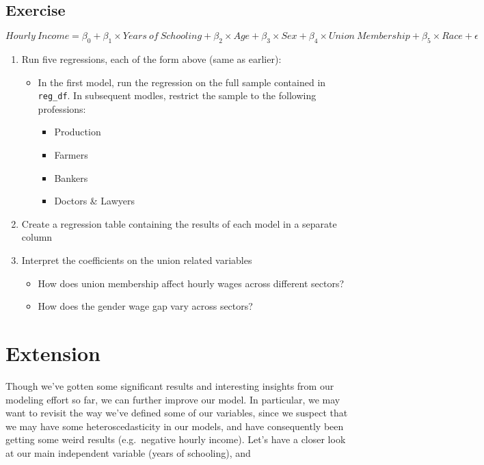 \documentclass[
  letterpaper,
  DIV=11,
  numbers=noendperiod]{scrreprt}
\providecommand{\tightlist}{%
  \setlength{\itemsep}{0pt}\setlength{\parskip}{0pt}}\usepackage{longtable,booktabs,array}
\begin{document}
\hypertarget{exercise-27}{%
\subsection{Exercise}\label{exercise-27}}

\[ Hourly\ Income= \beta_0 + \beta_1 \times Years\ of\ Schooling + \beta_2 \times Age + \beta_3 \times Sex + \beta_4 \times Union\ Membership + \beta_5 \times Race +\epsilon \]

\begin{enumerate}
\def\labelenumi{\arabic{enumi}.}
\tightlist
\item
  Run five regressions, each of the form above (same as earlier):

  \begin{itemize}
  \tightlist
  \item
    In the first model, run the regression on the full sample contained
    in \texttt{reg\_df}. In subsequent modles, restrict the sample to
    the following professions:

    \begin{itemize}
    \tightlist
    \item
      Production
    \item
      Farmers
    \item
      Bankers
    \item
      Doctors \& Lawyers
    \end{itemize}
  \end{itemize}
\item
  Create a regression table containing the results of each model in a
  separate column
\item
  Interpret the coefficients on the union related variables

  \begin{itemize}
  \tightlist
  \item
    How does union membership affect hourly wages across different
    sectors?
  \item
    How does the gender wage gap vary across sectors?
  \end{itemize}
\end{enumerate}

\hypertarget{extension-4}{%
\section{Extension}\label{extension-4}}

Though we've gotten some significant results and interesting insights
from our modeling effort so far, we can further improve our model. In
particular, we may want to revisit the way we've defined some of our
variables, since we suspect that we may have some heteroscedasticity in
our models, and have consequently been getting some weird results
(e.g.~negative hourly income). Let's have a closer look at our main
independent variable (years of schooling), and
\end{document}
